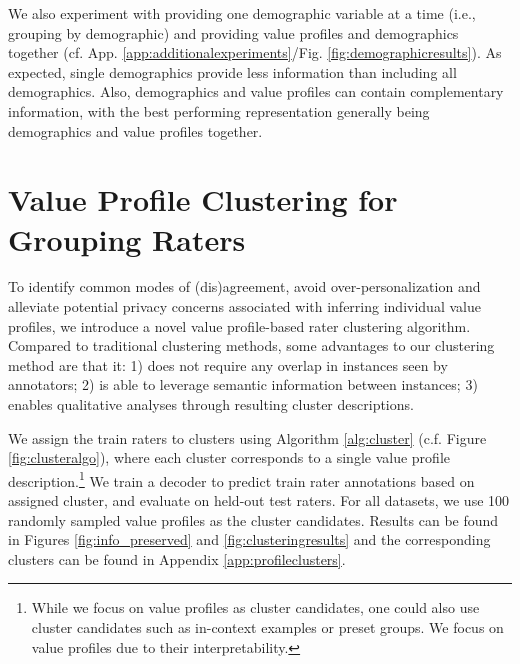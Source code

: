 \documentclass[11pt]{article}
\begin{document}
We also experiment with providing one demographic variable at a time (i.e., grouping by demographic) and providing value profiles and demographics together (cf. App. \ref{app:additionalexperiments}/Fig. \ref{fig:demographicresults}). As expected, single demographics provide less information than including all demographics. Also, demographics and value profiles can contain complementary information, with the best performing representation generally being demographics and value profiles together.


\section{Value Profile Clustering for Grouping Raters}
\label{sec:clustering}

To identify common modes of (dis)agreement, avoid over-personalization \citep{kirk2024benefits} and alleviate potential privacy concerns associated with inferring individual value profiles, we introduce a novel value profile-based rater clustering algorithm. Compared to traditional clustering methods, some advantages to our clustering method are that it: 1) does not require any overlap in instances seen by annotators; 2) is able to leverage semantic information between instances; 3) enables qualitative analyses through resulting cluster descriptions.

We assign the train raters to clusters using Algorithm \ref{alg:cluster} (c.f. Figure \ref{fig:clusteralgo}), where each cluster corresponds to a single value profile description.\footnote{While we focus on value profiles as cluster candidates, one could also use cluster candidates such as in-context examples or preset groups. We focus on value profiles due to their interpretability.} We train a decoder to predict train rater annotations based on assigned cluster, and evaluate on held-out test raters. For all datasets, we use 100 randomly sampled value profiles as the cluster candidates. Results can be found in Figures \ref{fig:info_preserved} and \ref{fig:clusteringresults} and the corresponding clusters can be found in Appendix \ref{app:profileclusters}.
\end{document}
